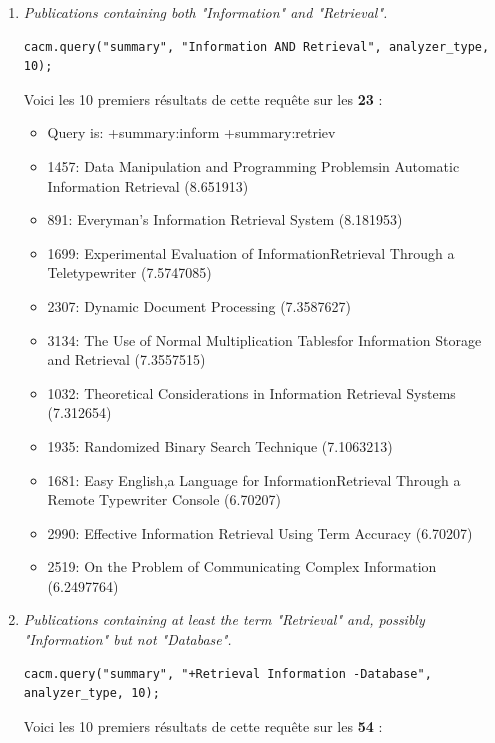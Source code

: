 \begin{enumerate}
\item \textit{Publications containing both "Information" and "Retrieval".}

\begin{lstlisting}
cacm.query("summary", "Information AND Retrieval", analyzer_type, 10);
\end{lstlisting}

Voici les 10 premiers résultats de cette requête sur les \textbf{23} :

\begin{itemize}
    \item Query is: +summary:inform +summary:retriev
    \item 1457: Data Manipulation and Programming Problemsin Automatic Information Retrieval (8.651913)
    \item 891: Everyman's Information Retrieval System (8.181953)
    \item 1699: Experimental Evaluation of InformationRetrieval Through a Teletypewriter (7.5747085)
    \item 2307: Dynamic Document Processing (7.3587627)
    \item 3134: The Use of Normal Multiplication Tablesfor Information Storage and Retrieval (7.3557515)
    \item 1032: Theoretical Considerations in Information Retrieval Systems (7.312654)
    \item 1935: Randomized Binary Search Technique (7.1063213)
    \item 1681: Easy English,a Language for InformationRetrieval Through a Remote Typewriter Console (6.70207)
    \item 2990: Effective Information Retrieval Using Term Accuracy (6.70207)
    \item 2519: On the Problem of Communicating Complex Information (6.2497764)\\
\end{itemize}

\item \textit{Publications containing at least the term "Retrieval" and, possibly "Information" but not "Database".}

\begin{lstlisting}
cacm.query("summary", "+Retrieval Information -Database", analyzer_type, 10);
\end{lstlisting}

Voici les 10 premiers résultats de cette requête sur les \textbf{54} :


\end{enumerate}
